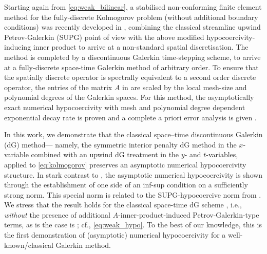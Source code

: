 \documentclass{amsart}
\theoremstyle{definition}
\theoremstyle{remark}
\numberwithin{equation}{section}
\begin{document}
	Starting again from \eqref{eq:weak_bilinear}, a stabilised non-conforming finite element method for the fully-discrete Kolmogorov problem (without additional boundary conditions) was recently developed in \cite{DonGeoHer24}, combining the classical streamline upwind Petrov-Galerkin (SUPG) point of view with the above modified hypocoercivity-inducing inner product to arrive at a non-standard spatial discretisation. The method is completed by a discontinuous Galerkin time-stepping scheme, to arrive at a fully-discrete space-time Galerkin method of arbitrary order. To ensure that the spatially discrete operator is spectrally equivalent to a second order discrete operator, the entries of the matrix $A$ in \cite{DonGeoHer24} are scaled by the local mesh-size and polynomial degrees of the Galerkin spaces.  For this method, the asymptotically exact numerical hypocoercivity with mesh and polynomial degree dependent exponential decay rate is proven  {and} a complete a priori error analysis is given \cite{DonGeoHer24}.


In this work, we demonstrate that the  {classical} space–time discontinuous Galerkin (dG) method— {namely, the symmetric interior penalty dG method in the $x$-variable combined with an upwind dG treatment in the $y$- and $t$-variables}, applied to \eqref{eq:kolmogorov} preserves an asymptotic numerical hypocoercivity structure.  In stark contrast to \cite{georgoulis,  DonGeoHer24}, the asymptotic numerical hypocoercivity is shown through the establishment of one side of an inf-sup condition on a sufficiently strong norm. This special norm is related to the SUPG-hypocoercive norm from \cite{DonGeoHer24}. We stress that the result holds for  the classical space-time dG scheme \cite{hss}, i.e., \emph{without} the presence of additional $A$-inner-product-induced Petrov-Galerkin-type terms, as is the case is \cite{georgoulis,  DonGeoHer24};  cf., \eqref{eq:weak_hypo}. To the best of our knowledge, this is the first demonstration of (asymptotic) numerical hypocoercivity for a well-known/classical Galerkin method.
\end{document}
